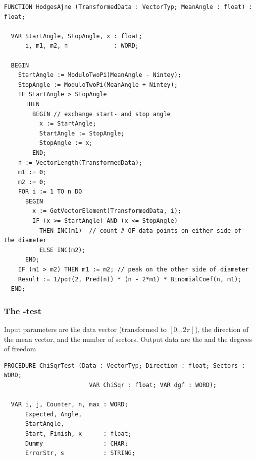 \begin{refsection}
\begin{lstlisting}[caption=Omnibus-test]
  FUNCTION HodgesAjne (TransformedData : VectorTyp; MeanAngle : float) : float;

  VAR StartAngle, StopAngle, x : float;
      i, m1, m2, n             : WORD;

  BEGIN
    StartAngle := ModuloTwoPi(MeanAngle - Nintey);
    StopAngle := ModuloTwoPi(MeanAngle + Nintey);
    IF StartAngle > StopAngle
      THEN
        BEGIN // exchange start- and stop angle
          x := StartAngle;
          StartAngle := StopAngle;
          StopAngle := x;
        END;
    n := VectorLength(TransformedData);
    m1 := 0;
    m2 := 0;
    FOR i := 1 TO n DO
      BEGIN
        x := GetVectorElement(TransformedData, i);
        IF (x >= StartAngle) AND (x <= StopAngle)
          THEN INC(m1)  // count # OF data points on either side of the diameter
          ELSE INC(m2);
      END;
    IF (m1 > m2) THEN m1 := m2; // peak on the other side of diameter
    Result := 1/pot(2, Pred(n)) * (n - 2*m1) * BinomialCoef(n, m1);
  END;
\end{lstlisting}


\subsubsection{The -test}

Input parameters are the data vector (transformed to \( [0\ldots 2\pi] \)), the direction of the mean vector, and the number of sectors. Output data are the  and the degrees of freedom.

\begin{lstlisting}[caption=\skalar{\chi^2}-test for homogeneous distribution]
  PROCEDURE ChiSqrTest (Data : VectorTyp; Direction : float; Sectors : WORD;
                        VAR ChiSqr : float; VAR dgf : WORD);

  VAR i, j, Counter, n, max : WORD;
      Expected, Angle,
      StartAngle,
      Start, Finish, x      : float;
      Dummy                 : CHAR;
      ErrorStr, s           : STRING;


\end{lstlisting}
\end{refsection}
